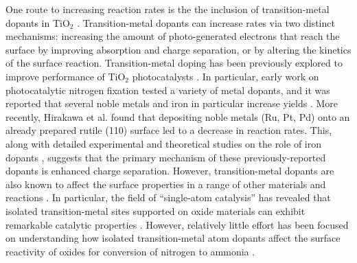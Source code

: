 One route to increasing reaction rates is the the inclusion of transition\hyp{}metal dopants in TiO$_2$ \cite{Zaleska_2008}.  Transition\hyp{}metal dopants can increase rates via two distinct mechanisms: increasing the amount of photo-generated electrons that reach the surface by improving absorption and charge separation, or by altering the kinetics of the surface reaction.
Transition-metal doping has been previously explored to improve performance of TiO$_2$ photocatalysts \cite{Schneider_2014, Li_2007, Dozzi_2013}. In particular, early work on photocatalytic nitrogen fixation tested a variety of metal dopants, and it was reported that several noble metals \cite{Ranjit_1996} and iron in particular increase yields \cite{Schrauzer_1977,Schrauzer_1983, Augugliaro_1982,Soria_1991, Ranjit_1996,Ranjit_1997}. More recently, Hirakawa et al. found that depositing noble metals (Ru, Pt, Pd) onto an already prepared rutile (110) surface led to a decrease in reaction rates.\cite{Hirakawa_2017} This, along with detailed experimental and theoretical studies on the role of iron dopants ,\cite{Soria_1991, Comer_2018} suggests that the primary mechanism of these previously-reported dopants is enhanced charge separation. However, transition-metal dopants are also known to affect the surface properties in a range of other materials and reactions \cite{Khan_2018,Gu_2014, Ammal_2016 Gu_2017,Comer_2018, Garc_a_Mota_2011, Yao_2017}. In particular, the field of ``single-atom catalysis'' has revealed that isolated transition-metal sites supported on oxide materials can exhibit remarkable catalytic properties \cite{Liu_2016}. However, relatively little effort has been focused on understanding how isolated transition-metal atom dopants affect the surface reactivity of oxides for conversion of nitrogen to ammonia \cite{Tao_2019, Liu_2019, Zhao_2019, Cheng_2019, Li_2017}.


